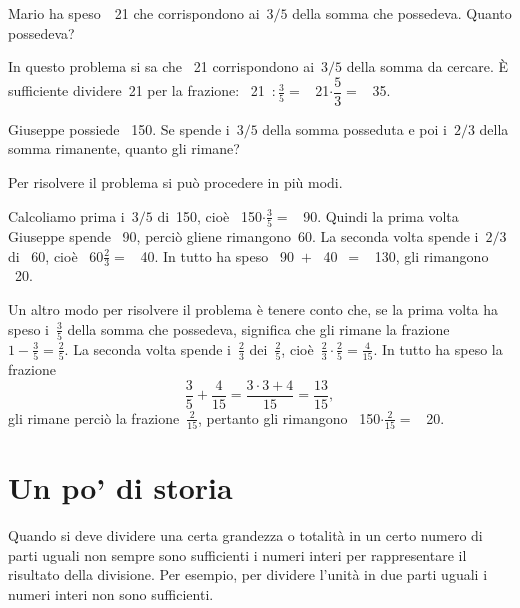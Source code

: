 \begin{exrig}
 \begin{esempio}
Mario ha speso~\officialeuro\ 21 che corrispondono ai~\(3/5\) della somma 
che possedeva. Quanto possedeva?

In questo problema si sa che \officialeuro\ 21 corrispondono ai~\(3/5\) della 
somma da cercare.
È sufficiente dividere~21 per la frazione:
\officialeuro\ 21~\(\displaystyle:\frac{3}{5}=\) \officialeuro\ 
21\(\cdot\dfrac{5}{3}=\) \officialeuro\ 35.
 \end{esempio}

 \begin{esempio}
Giuseppe possiede \officialeuro\ 150. Se spende i~\(3/5\) della somma 
posseduta e 
poi i~\(2/3\) della somma rimanente, quanto gli rimane?

Per risolvere il problema si può procedere in più modi.

Calcoliamo prima i~\(3/5\) di~150, cioè \officialeuro\ 150\(\cdot\frac{3}{5}=\) 
\officialeuro\ 90.
Quindi la prima volta Giuseppe spende \officialeuro\ 90, perciò gliene 
rimangono~60. La seconda volta spende i~\(2/3\) di \officialeuro\ 60, 
cioè \officialeuro\ 60\(\frac{2}{3}=\) \officialeuro\ 40. In tutto ha speso
\officialeuro\ 90~\(+\) \officialeuro\ 40~\(=\) \officialeuro\ 130, gli 
rimangono \officialeuro\ 20.

Un altro modo per risolvere il problema è tenere conto che,
se la prima volta ha speso i~\(\frac{3}{5}\) della somma che possedeva,
significa che gli rimane la frazione~\(1-\frac{3}{5}=\frac{2}{5}\).
La seconda volta spende i~\(\frac{2}{3}\) dei~\(\frac{2}{5}\), cioè~\(\frac{2}{3}
\cdot\frac{2}{5}=\frac{4}{15}\).
In tutto ha speso la frazione
\[\frac{3}{5}+\frac{4}{15}=\frac{3\cdot3+4}{15}=\frac{13}{15},\]
 gli rimane perciò la frazione~\(\frac{2}{15}\), pertanto gli rimangono 
 \officialeuro\ 150\(\cdot\frac{2}{15}=\) \officialeuro\ 20.
 \end{esempio}
\end{exrig}


\section{Un po' di  storia}

Quando si deve dividere una certa grandezza o totalità in un certo numero di 
parti uguali non sempre sono sufficienti i numeri interi per rappresentare 
il risultato della divisione. Per esempio, per dividere l'unità in due parti 
uguali i numeri interi non sono sufficienti.

